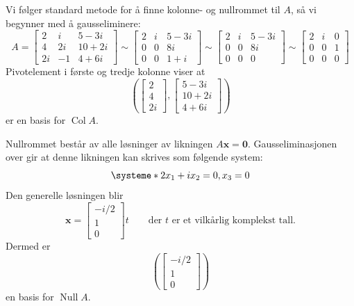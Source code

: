 \documentclass[notitlepage,a4paper,12pt,norsk]{IMFeksamen}
\newcommand{\roweq}{\sim}
\DeclareMathOperator{\Null}{Null}
\DeclareMathOperator{\Col}{Col}
\newcommand{\V}[1]{\mathbf{#1}}
\newcommand{\vvv}[3]{\begin{bmatrix} #1 \\ #2 \\ #3 \end{bmatrix}}
\newcommand{\x}{\V{x}}
\newcommand{\0}{\V{0}}
\newcommand{\oppgslutt}{
\begin{center}
\pgfornament[width=6cm]{88}
\end{center}
}
\newenvironment{losning}{\begin{oppgave}}{\oppgslutt\end{oppgave}}
\begin{document}
\begin{losning}
Vi følger standard metode for å finne kolonne- og nullrommet til $A$,
så vi begynner med å gausseliminere:
\[
A =
\begin{bmatrix}
2 & i & 5-3i\\
4 & 2i & 10+2i\\
2i & -1 & 4+6i
\end{bmatrix}
\roweq
\begin{bmatrix}
2 & i & 5-3i\\
0 & 0 & 8i\\
0 & 0 & 1+i
\end{bmatrix}
\roweq
\begin{bmatrix}
2 & i & 5-3i\\
0 & 0 & 8i\\
0 & 0 & 0
\end{bmatrix}
\roweq
\begin{bmatrix}
2 & i & 0 \\
0 & 0 & 1 \\
0 & 0 & 0
\end{bmatrix}
\]
Pivotelement i første og tredje kolonne viser at
\[
\left( \vvv{2}{4}{2i}, \vvv{5-3i}{10+2i}{4+6i} \right)
\]
er en basis for $\Col A$.

Nullrommet består av alle løsninger av likningen $A \x = \0$.
Gausseliminasjonen over gir at denne likningen kan skrives som
følgende system:
\[
\systeme*{
2x_1 + ix_2 = 0,
x_3 = 0
}
\]
Den generelle løsningen blir
\[
\x = \vvv{-i/2}{1}{0} t
\qquad\text{der $t$ er et vilkårlig komplekst tall.}
\]
Dermed er
\[
\left( \vvv{-i/2}{1}{0} \right)
\]
en basis for $\Null A$.
 

\end{losning}
\end{document}
